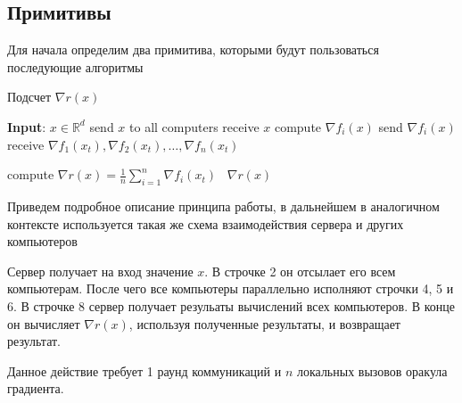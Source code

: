 \documentclass[a4paper,12pt]{extarticle}
\begin{document}
\subsection{Примитивы}
Для начала определим два примитива, которыми будут пользоваться последующие алгоритмы

    \begin{algorithm}[]
    \caption{Подсчет $\nabla r(x)$}
    \begin{algorithmic}[1]
    
    \STATE{} \textbf{Input}: $x \in \mathbb{R}^d$
    \STATE{} send $x$ to all computers 
    \vspace{0.5ex}
    \vspace{0.5ex}
    \vspace{0.5ex}
    \STATE{} receive $x$
    \vspace{0.5ex}
    \STATE{} compute $\nabla f_i(x)$
    \vspace{0.5ex}
    \STATE{} send $\nabla f_i(x)$
    \vspace{0.5ex}
    \ENDFOR{}
    \vspace{0.5ex}
    \STATE{} receive $\nabla f_1(x_t), \nabla f_2(x_t), \ldots, \nabla f_n(x_t)$
    \vspace{0.5ex}
    
    \STATE{} compute $\nabla r(x)= \frac{1}{n} \sum_{i = 1}^{n}  \nabla f_i(x_t)$\
    \RETURN{} $\nabla r(x)$
    \end{algorithmic}
    \end{algorithm}
    Приведем подробное описание принципа работы,
    в дальнейшем в аналогичном контексте используется такая же схема
    взаимодействия сервера и других компьютеров

    Сервер получает на вход значение $x$. В строчке 2 он отсылает его всем компьютерам. 
    После чего все компьютеры параллельно исполняют строчки 4, 5 и 6.
    В строчке 8 сервер получает резульаты вычислений всех компьютеров. 
    В конце он вычисляет $\nabla r(x)$, используя полученные результаты, и возвращает результат. 


    Данное действие требует 1 раунд коммуникаций и $n$ локальных вызовов оракула градиента. 
\end{document}
